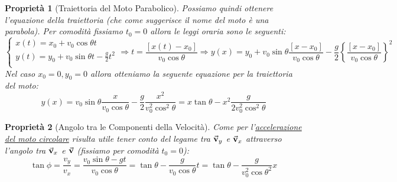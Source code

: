 \documentclass{article}
\newtheorem{property}{Proprietà}[section]
\newcommand{\then}{\ensuremath{\Rightarrow}}
\renewcommand{\v}{\va{v}}
\begin{document}
\begin{property}[Traiettoria del Moto Parabolico]
Possiamo quindi ottenere l'equazione della traiettoria (che come suggerisce il nome del moto è una parabola). Per comodità fissiamo $t_0=0$ allora le leggi oraria sono le seguenti:
\[\left\{\begin{array}{l}
    x(t)=x_0+v_0\cos\theta t \\
    y(t)=y_0+v_0\sin\theta t-\frac{g}{2}t^2 \\ 
\end{array}\right.\then t=\frac{[x(t)-x_0]}{v_0\cos\theta}\then y(x)=y_0+v_0\sin\theta\frac{[x-x_0]}{v_0\cos\theta}-\frac{g}{2}\left\{\frac{[x-x_0]}{v_0\cos\theta}\right\}^2\]
Nel caso $x_0=0,y_0=0$ allora otteniamo la seguente equazione per la traiettoria del moto:
\[y(x)=v_0\sin\theta\frac{x}{v_0\cos\theta}-\frac{g}{2}\frac{x^2}{v_0^2\cos^2\theta}=x\tan\theta-x^2\frac{g}{2v_0^2\cos^2\theta}\]
\end{property}

\begin{property}[Angolo tra le Componenti della Velocità]
Come per l'\hyperlink{angoloaccmotocirc}{accelerazione del moto circolare} risulta utile tener conto del legame tra $\v_y$ e $\v_x$ attraverso l'angolo tra $\v_x$ e $\v$ (fissiamo per comodità $t_0=0$):
\[\tan\phi=\frac{v_y}{v_x}=\frac{v_0\sin\theta-gt}{v_0\cos\theta}=\tan\theta-\frac{g}{v_0\cos\theta}t=\tan\theta-\frac{g}{v_0^2\cos\theta^2}x\]
\end{property}
\end{document}
